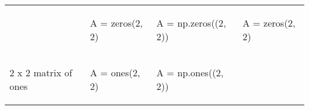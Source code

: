 \documentclass[10pt, landscape]{article}
\newenvironment{Shaded}{}{}
\newcommand{\DecValTok}[1]{\textcolor[rgb]{0.25,0.63,0.44}{{#1}}}
\newcommand{\FloatTok}[1]{\textcolor[rgb]{0.25,0.63,0.44}{{#1}}}
\newcommand{\OperatorTok}[1]{\textcolor[rgb]{0.40,0.40,0.40}{{#1}}}
\newcommand{\NormalTok}[1]{{#1}}
\begin{document}
\begin{multicols}{2}
\begin{tabular}[ ]{@{}llll@{}}
\begin{minipage}[t]{0.24\columnwidth}
\end{minipage} & \begin{minipage}[t]{0.20\columnwidth}\raggedright\strut
\begin{Shaded}
\begin{Highlighting}[]
\NormalTok{A = zeros(}\FloatTok{2}\NormalTok{, }\FloatTok{2}\NormalTok{)}
\end{Highlighting}
\end{Shaded}
\strut
\end{minipage} & \begin{minipage}[t]{0.25\columnwidth}\raggedright\strut
\begin{Shaded}
\begin{Highlighting}[]
\NormalTok{A }\OperatorTok{=} \NormalTok{np.zeros((}\DecValTok{2}\NormalTok{, }\DecValTok{2}\NormalTok{))}
\end{Highlighting}
\end{Shaded}
\strut
\end{minipage} & \begin{minipage}[t]{0.20\columnwidth}\raggedright\strut
\begin{Shaded}
\begin{Highlighting}[]
\NormalTok{A = zeros(}\FloatTok{2}\NormalTok{, }\FloatTok{2}\NormalTok{)}
\end{Highlighting}
\end{Shaded}
\strut
\end{minipage}\tabularnewline
\begin{minipage}[t]{0.24\columnwidth}\raggedright\strut
2 x 2 matrix of ones\strut
\end{minipage} & \begin{minipage}[t]{0.20\columnwidth}\raggedright\strut
\begin{Shaded}
\begin{Highlighting}[]
\NormalTok{A = ones(}\FloatTok{2}\NormalTok{, }\FloatTok{2}\NormalTok{)}
\end{Highlighting}
\end{Shaded}
\strut
\end{minipage} & \begin{minipage}[t]{0.25\columnwidth}\raggedright\strut
\begin{Shaded}
\begin{Highlighting}[]
\NormalTok{A }\OperatorTok{=} \NormalTok{np.ones((}\DecValTok{2}\NormalTok{, }\DecValTok{2}\NormalTok{))}
\end{Highlighting}
\end{Shaded}
\strut
\end{minipage} & \begin{minipage}[t]{0.20\columnwidth}\raggedright\strut

\end{minipage}
\end{tabular}
\end{multicols}
\end{document}
